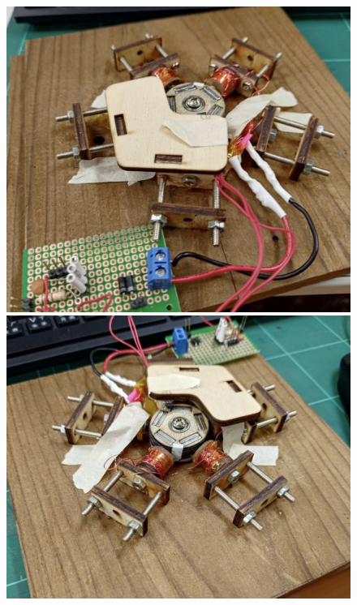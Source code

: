 \documentclass[12pt,a4paper]{article}
\begin{document}
\begin{CJK*}{UTF8}{bkai}
    \begin{figure}[h]
        \centering
        \includegraphics[height=0.2\textheight]{./images/finish1.png}
        \includegraphics[height=0.2\textheight]{./images/finish2.png}

\end{figure}
\end{CJK*}
\end{document}
